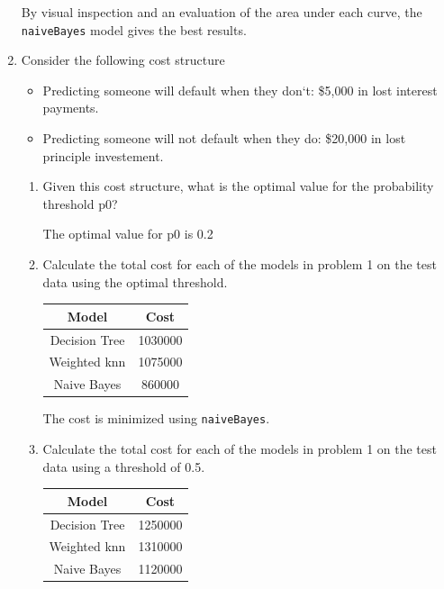 \documentclass[11pt]{article}
\begin{document}
\begin{enumerate}
\begin{enumerate}
  \end{enumerate}

By visual inspection and an evaluation of the area under each curve, the \verb|naiveBayes| model gives the best 
results.  

\item Consider the following cost structure
  \begin{itemize}
    \item Predicting someone will default when they don`t: \$5,000 in lost interest payments.

    \item Predicting someone will not default when they do: \$20,000 in lost principle investement. 
  \end{itemize}

  \begin{enumerate}
     \item Given this cost structure, what is the optimal value for the probability threshold p0? 

           The optimal value for p0 is 0.2

     \item Calculate the total cost for each of the models in problem 1 on the test data using the optimal threshold. 

           \begin{center}
              \begin{tabular}{|c | c |}
                \hline
                Model & Cost \\
                \hline
                Decision Tree & 1030000 \\
                Weighted knn & 1075000 \\
                Naive Bayes & 860000 \\
                \hline
              \end{tabular}
           \end{center}

           The cost is minimized using \verb|naiveBayes|. 

     \item Calculate the total cost for each of the models in problem 1 on the test data using a threshold of 0.5.

           \begin{center}
              \begin{tabular}{|c | c |}
                \hline
                Model & Cost \\
                \hline
                Decision Tree & 1250000 \\
                Weighted knn & 1310000 \\
                Naive Bayes & 1120000 \\
                \hline
              \end{tabular}
           \end{center}


\end{enumerate}
\end{enumerate}
\end{document}
